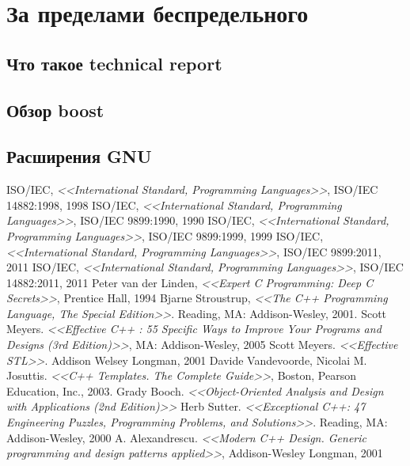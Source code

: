 \documentclass[a4paper,12pt,oneside]{article}
\begin{document}
\pagebreak
\section{За пределами беспредельного}

\subsection{Что такое technical report}

\subsection{Обзор boost}

\subsection{Расширения GNU}

\pagebreak
{}
\listoffigures

\pagebreak
{}
\begin{thebibliography}{99}
 ISO/IEC, \textit{<<International Standard, Programming Languages>>}, ISO/IEC 14882:1998, 1998
 ISO/IEC, \textit{<<International Standard, Programming Languages>>}, ISO/IEC 9899:1990, 1990
 ISO/IEC, \textit{<<International Standard, Programming Languages>>}, ISO/IEC 9899:1999, 1999
 ISO/IEC, \textit{<<International Standard, Programming Languages>>}, ISO/IEC 9899:2011, 2011
 ISO/IEC, \textit{<<International Standard, Programming Languages>>}, ISO/IEC 14882:2011, 2011
 Peter van der Linden, \textit{<<Expert C Programming: Deep C Secrets>>}, Prentice Hall, 1994
 Bjarne Stroustrup, \textit{<<The C++ Programming Language, The Special Edition>>}. Reading, MA: Addison-Wesley, 2001.
 Scott Meyers. \textit{<<Effective C++ : 55 Specific Ways to Improve Your Programs and Designs (3rd Edition)>>}, MA: Addison-Wesley, 2005
 Scott Meyers. \textit{<<Effective STL>>}. Addison Welsey Longman, 2001
 Davide Vandevoorde, Nicolai M. Josuttis. \textit{<<C++ Templates. The Complete Guide>>}, Boston, Pearson Education, Inc., 2003.
 Grady Booch. \textit{<<Object-Oriented Analysis and Design with Applications (2nd Edition)>>}
 Herb Sutter. \textit{<<Exceptional C++: 47 Engineering Puzzles, Programming Problems, and Solutions>>}. Reading, MA: Addison-Wesley, 2000
 A. Alexandrescu. \textit{<<Modern C++ Design. Generic programming and design patterns applied>>}, Addison-Wesley Longman, 2001
\end{thebibliography}

\pagebreak
{}
\printindex
\end{document}
